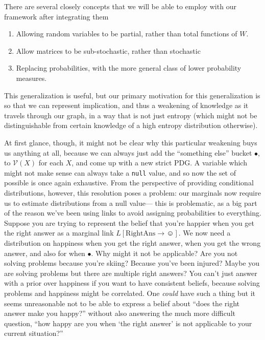 \documentclass{article}
\newcommand{\MN}{PDG}
\begin{document}
	There are several closely concepts that we will be able to employ with our framework after integrating them
	\begin{enumerate}[nosep]
		\item Allowing random variables to be partial, rather than total functions of $W$. 
		\item Allow matrices to be sub-stochastic, rather than stochastic
		\item Replacing probabilities, with the more general class of lower probability measures.
	\end{enumerate}

	This generalization is useful, but our primary motivation for this generalization is so that we can represent implication, and thus a weakening of knowledge as it travels through our graph, in a way that is not just entropy (which might not be distinguishable from certain knowledge of a high entropy distribution otherwise). 

	At first glance, though, it might not be clear why this particular weakening buys us anything at all, because we can always just add the ``something else'' bucket $\bullet$, to $\mathcal V(X)$ for each $X$, and come up with a new strict \MN. A variable which might not make sense can always take a \texttt{null} value, and so now the set of possible is once again exhaustive. From the perspective of providing conditional distributions, however, this resolution poses a problem: our marginals now require us to estimate distributions from a null value--- this is problematic, as a big part of the reason we've been using links to avoid assigning probabilities to everything. Suppose you are trying to represent the belief that you're happier when you get the right answer as a marginal link $L[\mathrm{RightAns}\to \smiley]$. We now need a distribution on happiness when you get the right answer, when you get the wrong answer, and also for when $\bullet$. Why might it not be applicable? Are you not solving problems because you're skiing? Because you've been injured? Maybe you are solving problems but there are multiple right answers? You can't just answer with a prior over happiness if you want to have consistent beliefs, because solving problems and happiness might be correlated. One \emph{could} have such a thing but it seems unreasonable not to be able to express a belief about ``does the right answer make you happy?'' without also answering the much more difficult question, ``how happy are you when `the right answer' is not applicable to your current situation?''
\end{document}
